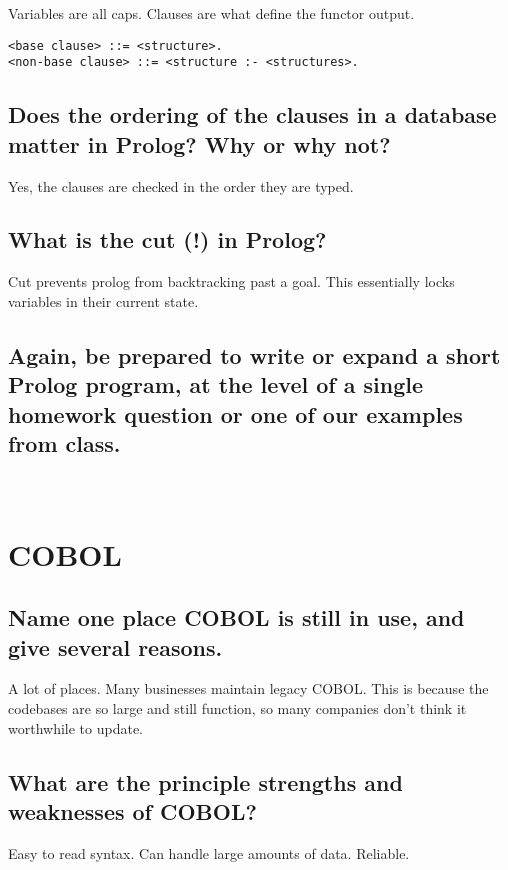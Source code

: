 \documentclass{article}
\begin{document}
Variables are all caps. Clauses are what define the functor output. 

\begin{verbatim}
<base clause> ::= <structure>.
<non-base clause> ::= <structure :- <structures>.
\end{verbatim}

\subsection{Does the ordering of the clauses in a database matter in Prolog? Why or why not?}

Yes, the clauses are checked in the order they are typed.

\subsection{What is the cut (!) in Prolog?}

Cut prevents prolog from backtracking past a goal. This essentially locks variables in their current state.

\subsection{Again, be prepared to write or expand a short Prolog program, at the level of a single homework question or one of our examples from class.}

~

\section{COBOL}

\subsection{Name one place COBOL is still in use, and give several reasons.}

A lot of places. Many businesses maintain legacy COBOL. This is because the codebases are so large and still function, so many companies don't think it worthwhile to update.

\subsection{What are the principle strengths and weaknesses of COBOL?}

Easy to read syntax. Can handle large amounts of data. Reliable.
\end{document}
